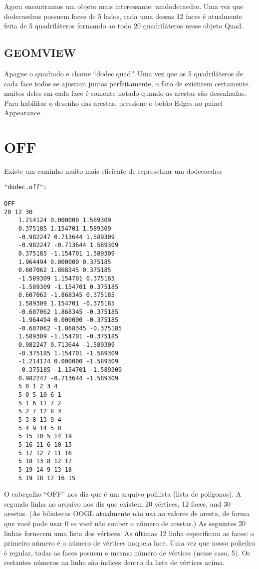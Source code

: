\documentclass[12pt,a4paper]{book}
\begin{document}
Agora encontramos um objeto mais interessante: umdodecaedro.  Uma vez que
dodecaedros possuem faces de 5 lados, cada uma dessas 12 faces \'e atualmente feita
de 5 quadril\'ateros formando ao todo 20 quadril\'ateros nesse objeto Quad.

\section{GEOMVIEW}

Apague o quadrado e chame ``dodec.quad''. Uma vez que os 5
quadril\'ateros de cada face todos se ajustam juntos perfeitamente, o fato de
existirem certamente muitos deles em cada face \'e somente notado quando as
arestas s\~ao desenhadas. Para habilitar o desenho das arestas, pressione o bot\~ao Edges no
painel Appearance.

\chapter{OFF}

Existe um caminho muito mais eficiente de represetnar um dodecaedro.

\begin{verbatim}
"dodec.off":

OFF
20 12 30
	1.214124 0.000000 1.589309
	0.375185 1.154701 1.589309
	-0.982247 0.713644 1.589309
	-0.982247 -0.713644 1.589309
	0.375185 -1.154701 1.589309
	1.964494 0.000000 0.375185
	0.607062 1.868345 0.375185
	-1.589309 1.154701 0.375185
	-1.589309 -1.154701 0.375185
	0.607062 -1.868345 0.375185
	1.589309 1.154701 -0.375185
	-0.607062 1.868345 -0.375185
	-1.964494 0.000000 -0.375185
	-0.607062 -1.868345 -0.375185
	1.589309 -1.154701 -0.375185
	0.982247 0.713644 -1.589309
	-0.375185 1.154701 -1.589309
	-1.214124 0.000000 -1.589309
	-0.375185 -1.154701 -1.589309
	0.982247 -0.713644 -1.589309
	5 0 1 2 3 4
	5 0 5 10 6 1
	5 1 6 11 7 2
	5 2 7 12 8 3
	5 3 8 13 9 4
	5 4 9 14 5 0
	5 15 10 5 14 19
	5 16 11 6 10 15
	5 17 12 7 11 16
	5 18 13 8 12 17
	5 19 14 9 13 18
	5 19 18 17 16 15
\end{verbatim}

O cabe\c{c}alho ``OFF'' nos diz que \'e um arquivo polilista (lista de pol\'igonos). A segunda linha no
arquivo nos diz que existem 20 v\'ertices, 12 faces, and 30 arestas.
(As biliotecas OOGL atualmente n\~ao usa ao valores de aresta, de forma que voc\^e pode
usar 0 se voc\^e n\~ao souber o n\'umero de arestas.)  As seguintes 20
linhas fornecem uma lista dos v\'ertices. As \'ultimas 12 linha especificam as faces:
o primeiro n\'umero \'e o n\'umero de v\'ertices naquela face. Uma vez que nosso
poliedro \'e regular, todas as faces posuem o mesmo n\'umero de
v\'ertices (nesse caso, 5).  Os restantes n\'umeros na linha s\~ao
\'indices dentro da lista de v\'ertices acima.
\end{document}
